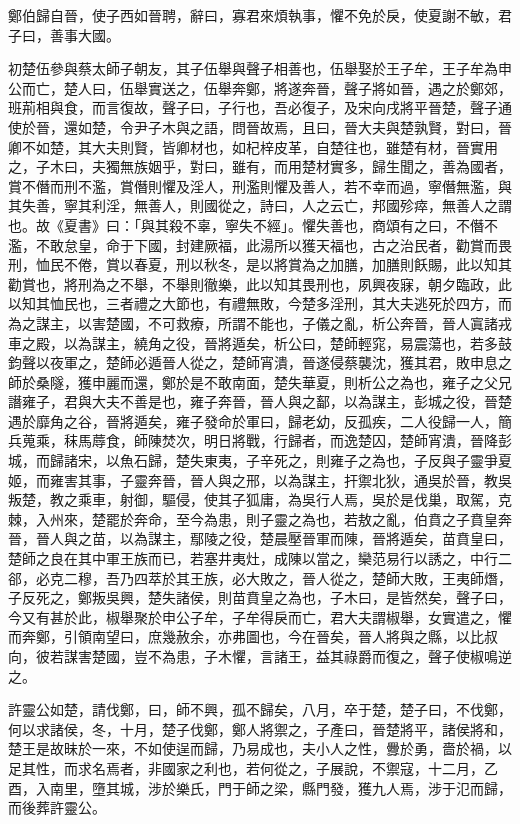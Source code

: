 \begin{pinyinscope}
鄭伯歸自晉，使子西如晉聘，辭曰，寡君來煩執事，懼不免於戾，使夏謝不敏，君子曰，善事大國。

初楚伍參與蔡太師子朝友，其子伍舉與聲子相善也，伍舉娶於王子牟，王子牟為申公而亡，楚人曰，伍舉實送之，伍舉奔鄭，將遂奔晉，聲子將如晉，遇之於鄭郊，班荊相與食，而言復故，聲子曰，子行也，吾必復子，及宋向戌將平晉楚，聲子通使於晉，還如楚，令尹子木與之語，問晉故焉，且曰，晉大夫與楚孰賢，對曰，晉卿不如楚，其大夫則賢，皆卿材也，如杞梓皮革，自楚往也，雖楚有材，晉實用之，子木曰，夫獨無族姻乎，對曰，雖有，而用楚材實多，歸生聞之，善為國者，賞不僭而刑不濫，賞僭則懼及淫人，刑濫則懼及善人，若不幸而過，寧僭無濫，與其失善，寧其利淫，無善人，則國從之，詩曰，人之云亡，邦國殄瘁，無善人之謂也。故《夏書》曰：「與其殺不辜，寧失不經」。懼失善也，商頌有之曰，不僭不濫，不敢怠皇，命于下國，封建厥福，此湯所以獲天福也，古之治民者，勸賞而畏刑，恤民不倦，賞以春夏，刑以秋冬，是以將賞為之加膳，加膳則飫賜，此以知其勸賞也，將刑為之不舉，不舉則徹樂，此以知其畏刑也，夙興夜寐，朝夕臨政，此以知其恤民也，三者禮之大節也，有禮無敗，今楚多淫刑，其大夫逃死於四方，而為之謀主，以害楚國，不可救療，所謂不能也，子儀之亂，析公奔晉，晉人寘諸戎車之殿，以為謀主，繞角之役，晉將遁矣，析公曰，楚師輕窕，易震蕩也，若多鼓鈞聲以夜軍之，楚師必遁晉人從之，楚師宵潰，晉遂侵蔡襲沈，獲其君，敗申息之師於桑隧，獲申麗而還，鄭於是不敢南面，楚失華夏，則析公之為也，雍子之父兄譖雍子，君與大夫不善是也，雍子奔晉，晉人與之鄐，以為謀主，彭城之役，晉楚遇於靡角之谷，晉將遁矣，雍子發命於軍曰，歸老幼，反孤疾，二人役歸一人，簡兵蒐乘，秣馬蓐食，師陳焚次，明日將戰，行歸者，而逸楚囚，楚師宵潰，晉降彭城，而歸諸宋，以魚石歸，楚失東夷，子辛死之，則雍子之為也，子反與子靈爭夏姬，而雍害其事，子靈奔晉，晉人與之邢，以為謀主，扞禦北狄，通吳於晉，教吳叛楚，教之乘車，射御，驅侵，使其子狐庸，為吳行人焉，吳於是伐巢，取駕，克棘，入州來，楚罷於奔命，至今為患，則子靈之為也，若敖之亂，伯賁之子賁皇奔晉，晉人與之苗，以為謀主，鄢陵之役，楚晨壓晉軍而陳，晉將遁矣，苗賁皇曰，楚師之良在其中軍王族而已，若塞井夷灶，成陳以當之，欒范易行以誘之，中行二郤，必克二穆，吾乃四萃於其王族，必大敗之，晉人從之，楚師大敗，王夷師熸，子反死之，鄭叛吳興，楚失諸侯，則苗賁皇之為也，子木曰，是皆然矣，聲子曰，今又有甚於此，椒舉聚於申公子牟，子牟得戾而亡，君大夫謂椒舉，女實遣之，懼而奔鄭，引領南望曰，庶幾赦余，亦弗圖也，今在晉矣，晉人將與之縣，以比叔向，彼若謀害楚國，豈不為患，子木懼，言諸王，益其祿爵而復之，聲子使椒鳴逆之。

許靈公如楚，請伐鄭，曰，師不興，孤不歸矣，八月，卒于楚，楚子曰，不伐鄭，何以求諸侯，冬，十月，楚子伐鄭，鄭人將禦之，子產曰，晉楚將平，諸侯將和，楚王是故昧於一來，不如使逞而歸，乃易成也，夫小人之性，釁於勇，嗇於禍，以足其性，而求名焉者，非國家之利也，若何從之，子展說，不禦寇，十二月，乙酉，入南里，墮其城，涉於樂氏，門于師之梁，縣門發，獲九人焉，涉于氾而歸，而後葬許靈公。


\end{pinyinscope}
